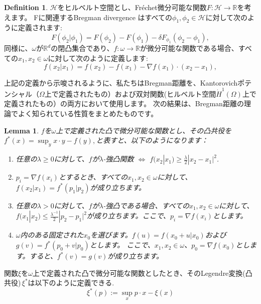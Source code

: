 \documentclass{jsarticle}
\newtheorem{lem}[thm]{Lemma}
\theoremstyle{definition}
\newtheorem{dfn}{Definition}[section]
\begin{document}
\begin{dfn}
  \label{dfn:Bregman divergence}
  $\mathcal{H}$をヒルベルト空間とし、Fréchet微分可能な関数$F: \mathcal{H} \to \mathbb{R}$を考えます。
  Fに関連するBregman divergence はすべての$\phi_1, \phi_2 \in \mathcal{H}$に対して次のように定義されます:
  $$
    F(\phi_2|\phi_1) = F(\phi_2) - F(\phi_1) - \delta F_{\phi_1}(\phi_2 - \phi_1),
  $$
  同様に、$\omega$が$\mathbb{R}^d$の閉凸集合であり、$f: \omega \rightarrow \mathbb{R}$が微分可能な関数である場合、すべての$x_1, x_2 \in \omega$に対して次のように定義します:
  $$
    f(x_2|x_1) = f(x_2) - f(x_1) - \nabla f(x_1) \cdot (x_2 - x_1),
  $$
\end{dfn}
上記の定義から示唆されるように、私たちはBregman距離を、Kantorovichポテンシャル（$\Omega$上で定義されたもの）および双対関数(ヒルベルト空間$\dot{H}^1(\Omega)$上で定義されたもの）の両方において使用します。
次の結果は、Bregman距離の理論でよく知られている性質をまとめたものです。

\begin{lem}
  \label{lem:convex conjugate}
  $f$を$\omega$上で定義された凸で微分可能な関数とし、その凸共役を$f^*(x) = \sup_y x\cdot y- f(y),$と表すと、以下のようになります：
  \begin{enumerate}
    \item 任意の$\lambda \geq 0$に対して、$f$が$\lambda$-強凸関数 $\Leftrightarrow$ $f(x_2|x_1) \geq \frac{\lambda}{2} |x_2 - x_1|^2$.
    \item $p_i = \nabla f(x_i)$とするとき、すべての$x_1, x_2 \in \omega$に対して、$f(x_2|x_1) = f^*(p_1|p_2)$が成り立ちます。
    \item 任意の$\lambda > 0$に対して、$f$が$\lambda$-強凸である場合、すべての$x_1, x_2 \in \omega$に対して、$f(x_1|x_2) \leq \frac{\lambda^{-1}}{2} |p_2 - p_1|^2$が成り立ちます。ここで、$p_i = \nabla f(x_i)$とします。
    \item $\omega$内のある固定された$x_0$を選びます。$f(u) = f(x_0 + u|x_0)$および$g(v) = f^*(p_0 + v|p_0)$とします。
          ここで、$x_1, x_2 \in \omega$、$p_0 = \nabla f(x_0)$とします。すると、$f^*(v) = g(v)$が成り立ちます。
  \end{enumerate}
\end{lem}


関数$\xi$を$\omega$上で定義された凸で微分可能な関数としたとき、そのLegendre変換(凸共役)\,$\xi^*$は以下のように定義できる.
$$
    \xi^*(p) := \sup_x p \cdot x - \xi(x) 
$$
\end{document}
